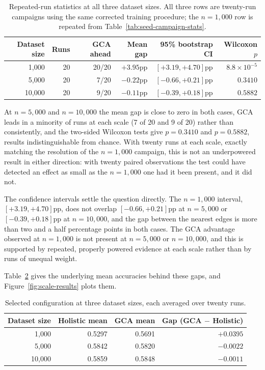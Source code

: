 \begin{table}[htbp]
\centering
\caption[Repeated-run statistics at all three dataset sizes]{Repeated-run statistics at all three dataset sizes. All three rows are
twenty-run campaigns using the same corrected training procedure; the
$n=1{,}000$ row is repeated from Table~\ref{tab:seed-campaign-stats}.}
\label{tab:scale-robustness-runs}
\begin{tabular}{rrrrrr}
\toprule
Dataset size & Runs & GCA ahead & Mean gap & 95\% bootstrap CI & Wilcoxon $p$ \\
\midrule
1{,}000  & 20 & 20/20 & $+3.95$pp & $[+3.19, +4.70]$pp & $8.8\times10^{-5}$ \\
5{,}000  & 20 & 7/20  & $-0.22$pp & $[-0.66, +0.21]$pp & $0.3410$ \\
10{,}000 & 20 & 9/20  & $-0.11$pp & $[-0.39, +0.18]$pp & $0.5882$ \\
\bottomrule
\end{tabular}
\end{table}

At $n=5{,}000$ and $n=10{,}000$ the mean gap is close to zero in both cases,
GCA leads in a minority of runs at each scale (7 of 20 and 9 of 20) rather
than consistently, and the two-sided Wilcoxon tests give $p=0.3410$ and
$p=0.5882$, results indistinguishable from chance. With twenty runs at each
scale, exactly matching the resolution of the $n=1{,}000$ campaign, this is
not an underpowered result in either direction: with twenty paired
observations the test could have detected an effect as small as the
$n=1{,}000$ one had it been present, and it did not.

The confidence intervals settle the question directly. The $n=1{,}000$
interval, $[+3.19, +4.70]$pp, does not overlap $[-0.66,
+0.21]$pp at $n=5{,}000$ or $[-0.39, +0.18]$pp at $n=10{,}000$, and the gap
between the nearest edges is more than two and a half percentage points in
both cases. The GCA advantage observed at $n=1{,}000$ is not present at
$n=5{,}000$ or $n=10{,}000$, and this is supported by repeated, properly
powered evidence at each scale rather than by runs of unequal weight.

Table~\ref{tab:scale-robustness} gives the underlying mean accuracies behind
these gaps, and Figure~\ref{fig:scale-results} plots them.

\begin{table}[htbp]
\centering
\caption[Selected configuration at three dataset sizes, repeated-run means]{Selected configuration at three dataset sizes, each averaged over
twenty runs.}
\label{tab:scale-robustness}
\begin{tabular}{rrrr}
\toprule
Dataset size & Holistic mean & GCA mean & Gap (GCA $-$ Holistic) \\
\midrule
1{,}000  & 0.5297 & 0.5691 & $+0.0395$ \\
5{,}000  & 0.5842 & 0.5820 & $-0.0022$ \\
10{,}000 & 0.5859 & 0.5848 & $-0.0011$ \\
\bottomrule
\end{tabular}
\end{table}


